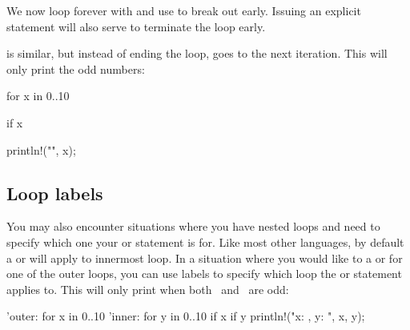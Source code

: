 We now loop forever with  and use  to break out early. Issuing an explicit  statement will also 
serve to terminate the loop early.

\blank

 is similar, but instead of ending the loop, goes to the next iteration. This will only print the odd numbers:

\begin{rustc}
for x in 0..10 {
    if x %

    println!("{}", x);
}
\end{rustc}

\subsection*{Loop labels}

You may also encounter situations where you have nested loops and need to specify which one your  or  
statement is for. Like most other languages, by default a  or  will apply to innermost loop. In a situation where you would like to a  or  for one of the outer loops, you can use labels to specify which loop the 
 or  statement applies to. This will only print when both \x\ and \y\ are odd:

\begin{rustc}
'outer: for x in 0..10 {
    'inner: for y in 0..10 {
        if x %
        if y %
        println!("x: {}, y: {}", x, y);
    }
}
\end{rustc}
